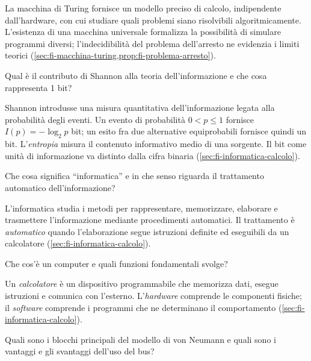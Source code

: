 La macchina di Turing fornisce un modello preciso di calcolo,
indipendente dall'hardware, con cui studiare quali problemi siano
risolvibili algoritmicamente. L'esistenza di una macchina universale
formalizza la possibilità di simulare programmi diversi; l'indecidibilità
del problema dell'arresto ne evidenzia i limiti teorici
(\cref{sec:fi-macchina-turing,prop:fi-problema-arresto}).

\begin{exercise}
\label{ex:fi-intro-shannon-bit}
Qual è il contributo di Shannon alla teoria dell'informazione e che
cosa rappresenta 1 bit?
\end{exercise}

Shannon introdusse una misura quantitativa dell'informazione legata
alla probabilità degli eventi. Un evento di probabilità \(0<p\le1\) fornisce
\(I(p)=-\log_2 p\) bit; un esito fra due alternative equiprobabili
fornisce quindi un bit. L'\emph{entropia} misura il contenuto informativo
medio di una sorgente. Il bit come unità di informazione va distinto
dalla cifra binaria (\cref{sec:fi-informatica-calcolo}).

\begin{exercise}
\label{ex:fi-intro-significato-informatica}
Che cosa significa ``informatica'' e in che senso riguarda il
trattamento automatico dell'informazione?
\end{exercise}

L'informatica studia i metodi per rappresentare, memorizzare,
elaborare e trasmettere l'informazione mediante procedimenti
automatici. Il trattamento è \emph{automatico} quando l'elaborazione
segue istruzioni definite ed eseguibili da un calcolatore
(\cref{sec:fi-informatica-calcolo}).

\begin{exercise}
\label{ex:fi-intro-calcolatore}
Che cos'è un computer e quali funzioni fondamentali svolge?
\end{exercise}

Un \emph{calcolatore} è un dispositivo programmabile che memorizza
dati, esegue istruzioni e comunica con l'esterno. L'\emph{hardware}
comprende le componenti fisiche; il \emph{software} comprende i
programmi che ne determinano il comportamento
(\cref{sec:fi-informatica-calcolo}).

\begin{exercise}
\label{ex:fi-intro-von-neumann-bus}
Quali sono i blocchi principali del modello di von Neumann e quali
sono i vantaggi e gli svantaggi dell'uso del bus?
\end{exercise}

